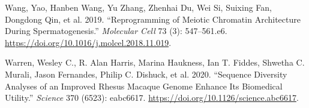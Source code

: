 \documentclass[
  11pt,
  a4paper,
]{scrbook}
\newlength{\cslhangindent}
\newenvironment{CSLReferences}[2] %
 {\begin{list}{}{%
  \setlength{\itemindent}{0pt}
  \setlength{\leftmargin}{0pt}
  \setlength{\parsep}{0pt}
  \ifodd #1
   \setlength{\leftmargin}{\cslhangindent}
   \setlength{\itemindent}{-1\cslhangindent}
  \fi
  \setlength{\itemsep}{#2\baselineskip}}}
 {\end{list}}
\let\oldemph\emph
\renewcommand\emph[1]{\oldemph{\color{gray}#1}}
\begin{document}
\begin{CSLReferences}{1}{0}
Wang, Yao, Hanben Wang, Yu Zhang, Zhenhai Du, Wei Si, Suixing Fan,
Dongdong Qin, et al. 2019. {``Reprogramming of {Meiotic Chromatin
Architecture} During {Spermatogenesis}.''} \emph{Molecular Cell} 73 (3):
547--561.e6. \url{https://doi.org/10.1016/j.molcel.2018.11.019}.

Warren, Wesley C., R. Alan Harris, Marina Haukness, Ian T. Fiddes,
Shwetha C. Murali, Jason Fernandes, Philip C. Dishuck, et al. 2020.
{``Sequence Diversity Analyses of an Improved Rhesus Macaque Genome
Enhance Its Biomedical Utility.''} \emph{Science} 370 (6523): eabc6617.
\url{https://doi.org/10.1126/science.abc6617}.

\end{CSLReferences}

\endgroup


\backmatter
\end{document}
